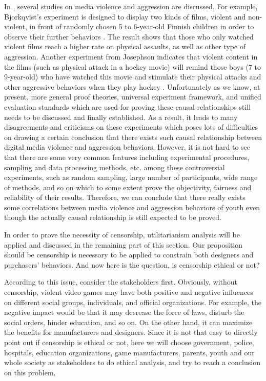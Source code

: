  In \cite{anderson2003}, several studies on media violence and aggression are discussed. For example, Bjorkqvist's experiment is designed to display two kinds of films, violent and non-violent, in front of randomly chosen 5 to 6-year-old Finnish children in order to observe their further behaviors \cite{bjorkqvist1985}. The result shows that those who only watched violent films reach a higher rate on physical assaults, as well as other type of aggression. Another experiment from Josephson indicates that violent content in the films (such as physical attack in a hockey movie) will remind those boys (7 to 9-year-old) who have watched this movie and stimulate their physical attacks and other aggressive behaviors when they play hockey \cite{josephson1987}. Unfortunately as we know, at present, more general proof theories, universal experiment framework, and unified evaluation standards which are used for proving these causal relationships still needs to be discussed and finally established. As a result, it leads to many disagreements and criticisms on these experiments which poses lots of difficulties on drawing a certain conclusion that there exists such causal relationship between digital media violence and aggression behaviors. However, it is not hard to see that there are some very common features including experimental procedures, sampling and data processing methods, etc. among these controversial experiments, such as random sampling, large number of participants, wide range of methods, and so on which to some extent prove the objectivity, fairness and reliability of their results. Therefore, we can conclude that there really exists some correlations between media violence and aggression behaviors of youth even though the actually causal relationship is still expected to be proved. 

In order to prove the necessity of censorship, utilitarianism analysis will be applied and discussed in the remaining part of this section. Our proposition should be censorship is necessary to be applied to constrain both designers and purchasers' behaviors. And now here is the question, is censorship ethical or not? 

According to this issue, consider the stakeholders first. Obviously, without censorship, violent video games may have both positive and negative influences on different social groups, individuals, and official organizations. For example, the negative impact would be that it may decrease the force of laws, disturb the social orders, hinder education, and so on. On the other hand, it can maximize the benefits for manufacturers and designers. Since it is not that easy to directly point out if censorship is ethical or not, here we will choose government, police, hospitals, education organizations, game manufacturers, parents, youth and our whole society as stakeholders to do ethical analysis, and try to reach a conclusion on this problem.


